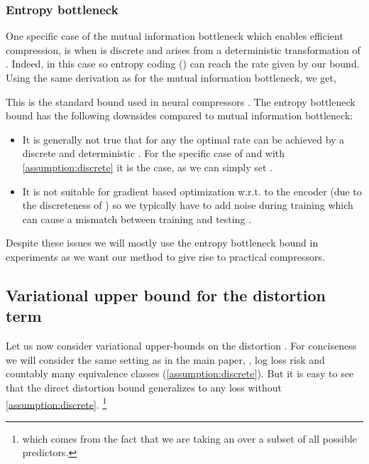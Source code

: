 \documentclass[final]{article}
\begin{document}
\subsubsection{Entropy bottleneck}
\label{appx:entropy_bottleneck}

One specific case of the mutual information bottleneck which enables efficient compression, is when  is discrete and arises from a deterministic transformation of . 
Indeed, in this case  so entropy coding (\eg \cite{rissanen_generalized_1976,duda_asymmetric_2009}) can reach the rate given by our bound.
Using the same derivation as for the mutual information bottleneck, we get,

This is the standard bound used in neural compressors \cite{balle_end--end_2017,theis_lossy_2017}.
The entropy bottleneck bound has the following downsides compared to mutual information bottleneck:
\begin{itemize}
\item It is generally not true that for any  the optimal rate can be achieved by a discrete and deterministic .
For the specific case of  and with \cref{assumption:discrete} it is the case, as we can simply set .
\item It is not suitable for gradient based optimization w.r.t. to the encoder (due to the discreteness of ) so we typically have to add noise during training \cite{balle_end--end_2017} which can cause a mismatch between training and testing \cite{agustsson_universally_2020}.
\end{itemize}

Despite these issues we will mostly use the entropy bottleneck bound in experiments as we want our method to give rise to practical compressors.

\subsection{Variational upper bound for the distortion term 
\texorpdfstring{}{R[M(X)|Z]}}
\label{appx:variational_distortion}


Let us now consider variational upper-bounds on the distortion .
For conciseness we will consider the same setting as in the main paper, \ie, log loss risk and countably many equivalence classes (\cref{assumption:discrete}).
But it is easy to see that the direct distortion bound generalizes to any loss without \cref{assumption:discrete}. \footnote{ which comes from the fact that we are taking an  over a subset  of all possible predictors.}
\end{document}
